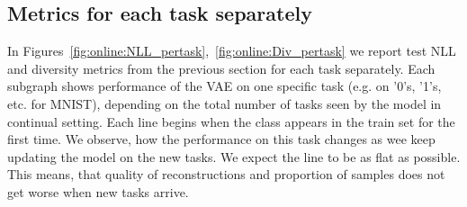 \subsection{Metrics for each task separately} \label{app:pertask}
In Figures~\ref{fig:online:NLL_pertask},~\ref{fig:online:Div_pertask} we report test NLL and diversity metrics from the previous section for each task separately. Each subgraph shows performance of the VAE on one specific task (e.g. on '0's, '1's, etc. for MNIST), depending on the total number of tasks seen by the model in continual setting. Each line begins when the class appears in the train set for the first time. We observe, how the performance on this task changes as wee keep updating the model on the new tasks. We expect the line to be as flat as possible. This means, that quality of reconstructions and proportion of samples does not get worse when new tasks arrive. 
